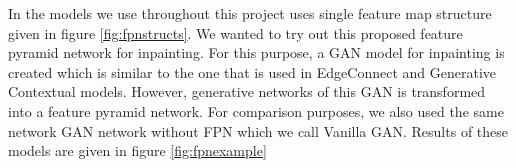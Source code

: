 In the models we use throughout this project uses single feature map structure given in figure \ref{fig:fpnstructs}. We wanted to try out this proposed feature pyramid network for inpainting. For this purpose, a GAN model for inpainting is created which is similar to the one that is used in EdgeConnect\cite{edgeconnect} and Generative Contextual\cite{generative_contextual} models. However, generative networks of this GAN is transformed into a feature pyramid network. For comparison purposes, we also used the same network GAN network without FPN which we call Vanilla GAN. Results of these models are given in figure \ref{fig:fpnexample}

\begin{figure}[!ht]
    \centering
        \hspace{0.02\columnwidth}
        \hspace{0.02\columnwidth}
        \hspace{0.02\columnwidth}

\end{figure}
